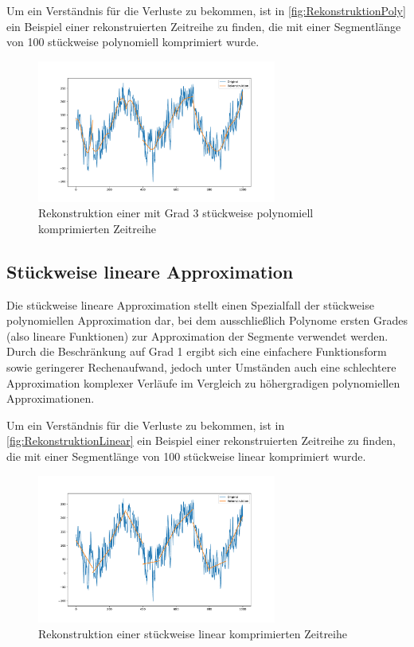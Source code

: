 Um ein Verständnis für die Verluste zu bekommen, ist in \autoref{fig:RekonstruktionPoly} ein Beispiel einer rekonstruierten Zeitreihe zu finden, die mit einer Segmentlänge von 100 stückweise polynomiell komprimiert wurde.
\begin{figure}[bth] 
  \centering
  \includegraphics[width=0.7\textwidth]{Graphics/RekonstruktionPoly.pdf}
  \caption{Rekonstruktion einer mit Grad 3 stückweise polynomiell komprimierten Zeitreihe}
  \label{fig:RekonstruktionPoly}
\end{figure}

\subsection{Stückweise lineare Approximation}
Die stückweise lineare Approximation stellt einen Spezialfall der stückweise polynomiellen Approximation dar, bei dem ausschließlich Polynome ersten Grades (also lineare Funktionen) zur Approximation der Segmente verwendet werden.
Durch die Beschränkung auf Grad 1 ergibt sich eine einfachere Funktionsform sowie geringerer Rechenaufwand, jedoch unter Umständen auch eine schlechtere Approximation komplexer Verläufe im Vergleich zu höhergradigen polynomiellen Approximationen.

Um ein Verständnis für die Verluste zu bekommen, ist in \autoref{fig:RekonstruktionLinear} ein Beispiel einer rekonstruierten Zeitreihe zu finden, die mit einer Segmentlänge von 100 stückweise linear komprimiert wurde.
\begin{figure}[bth] 
  \centering
  \includegraphics[width=0.7\textwidth]{Graphics/RekonstruktionLinear.pdf}
  \caption{Rekonstruktion einer stückweise linear komprimierten Zeitreihe}
  \label{fig:RekonstruktionLinear}
\end{figure}

